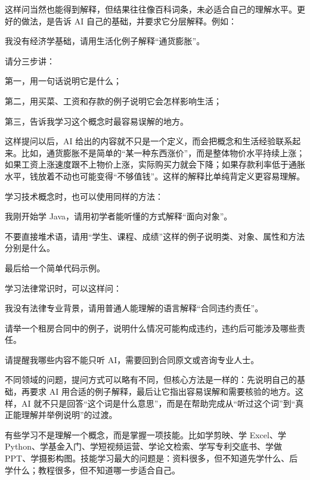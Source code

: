 这样问当然也能得到解释，但结果往往像百科词条，未必适合自己的理解水平。更好的做法，是告诉 AI 自己的基础，并要求它分层解释。例如：

\begin{tcolorbox}[promptbox]
我没有经济学基础，请用生活化例子解释“通货膨胀”。

请分三步讲：

第一，用一句话说明它是什么；

第二，用买菜、工资和存款的例子说明它会怎样影响生活；

第三，告诉我学习这个概念时最容易误解的地方。
\end{tcolorbox}

这样提问以后，AI 给出的内容就不只是一个定义，而会把概念和生活经验联系起来。比如，通货膨胀不是简单的“某一种东西涨价”，而是整体物价水平持续上涨；如果工资上涨速度跟不上物价上涨，实际购买力就会下降；如果存款利率低于通胀水平，钱放着不动也可能变得“不够值钱”。这样的解释比单纯背定义更容易理解。

学习技术概念时，也可以使用同样的方法：

\begin{tcolorbox}[promptbox]
我刚开始学 Java，请用初学者能听懂的方式解释“面向对象”。

不要直接堆术语，请用“学生、课程、成绩”这样的例子说明类、对象、属性和方法分别是什么。

最后给一个简单代码示例。
\end{tcolorbox}

学习法律常识时，可以这样问：

\begin{tcolorbox}[promptbox]
我没有法律专业背景，请用普通人能理解的语言解释“合同违约责任”。

请举一个租房合同中的例子，说明什么情况可能构成违约，违约后可能涉及哪些责任。

请提醒我哪些内容不能只听 AI，需要回到合同原文或咨询专业人士。
\end{tcolorbox}

不同领域的问题，提问方式可以略有不同，但核心方法是一样的：先说明自己的基础，再要求 AI 用合适的例子解释，最后让它指出容易误解和需要核验的地方。这样，AI 就不只是回答“这个词是什么意思”，而是在帮助完成从“听过这个词”到“真正能理解并举例说明”的过渡。


有些学习不是理解一个概念，而是掌握一项技能。比如学剪映、学 Excel、学 Python、学基金入门、学短视频运营、学论文检索、学写专利交底书、学做 PPT、学摄影构图。技能学习最大的问题是：资料很多，但不知道先学什么、后学什么；教程很多，但不知道哪一步适合自己。

